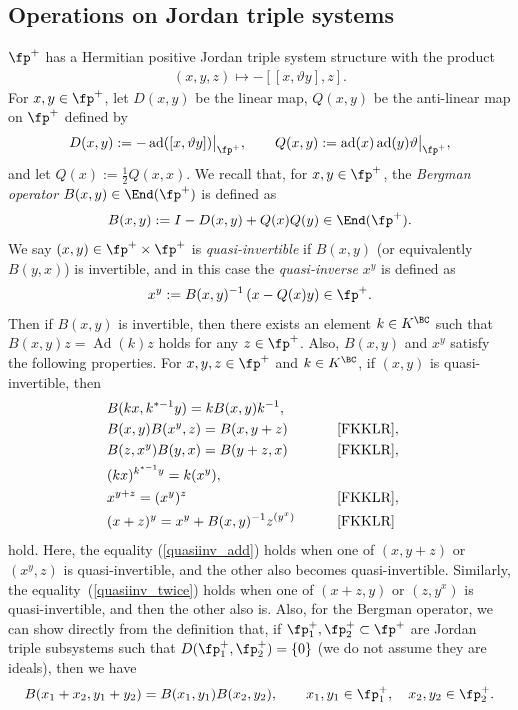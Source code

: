 \subsection{Operations on Jordan triple systems}
$\fp^+$ has a Hermitian positive Jordan triple system structure with the product
\begin{gather*} (x,y,z)\mapsto -[[x,\vartheta y],z]. \end{gather*}
For $x,y\in\fp^+$, let $D(x,y)$ be the linear map, $Q(x,y)$ be the anti-linear map on $\fp^+$ defined by
\begin{gather*} D(x,y):=-\operatorname{ad}([x,\vartheta y])\bigr|_{\fp^+},\qquad Q(x,y):=\operatorname{ad}(x)\operatorname{ad}(y)\vartheta\bigr|_{\fp^+}, \end{gather*}
and let $Q(x):=\frac{1}{2}Q(x,x)$.
We recall that, for $x,y\in\fp^+$, the \textit{Bergman operator} $B(x,y)\in\End(\fp^+)$ is defined as
\begin{gather*} B(x,y):=I-D(x,y)+Q(x)Q(y)\in\End(\fp^+). \end{gather*}
We say $(x,y)\in\fp^+\times\fp^+$ is \textit{quasi-invertible} if $B(x,y)$ (or equivalently $B(y,x)$) is invertible,
and in this case the \textit{quasi-inverse} $x^y$ is defined as
\begin{gather*} x^y:=B(x,y)^{-1} \left(x-Q(x)y\right)\in\fp^+. \end{gather*}
Then if $B(x,y)$ is invertible, then there exists an element $k\in K^\BC$ such that $B(x,y)z=\operatorname{Ad}(k)z$ holds for any $z\in\fp^+$.
Also, $B(x,y)$ and $x^y$ satisfy the following properties. For $x,y,z\in\fp^+$ and $k\in K^\BC$, if $(x,y)$ is quasi-invertible, then
\begin{alignat}{3}
& B(kx,k^{*-1}y) =kB(x,y)k^{-1}, &&\label{Bergman_k}\\
& B(x,y)B(x^y,z) =B(x,y+z) \qquad & & \text{\cite[Part V, Proposition III.3.1, (J6.4)]{FKKLR}},&\label{Bergman_left}\\
& B(z,x^y)B(y,x) =B(y+z,x) \qquad & & \text{\cite[Part V, Proposition III.3.1, (J6.4$'$)]{FKKLR}},&\label{Bergman_right}\\
& (kx)^{k^{*-1}y} =k(x^y), &&& \label{quasiinv_k}\\
& x^{y+z} =(x^y)^z \qquad & & \text{\cite[Part V, Theorem III.5.1(i)]{FKKLR}},& \label{quasiinv_add}\\
&(x+z)^y=x^y+B(x,y)^{-1}z^{(y^x)} \qquad & & \text{\cite[Part V, Theorem III.5.1(ii)]{FKKLR}}& \label{quasiinv_twice}
\end{alignat}
hold. Here, the equality (\ref{quasiinv_add}) holds when one of $(x,y+z)$ or $(x^y,z)$ is quasi-invertible,
and the other also becomes quasi-invertible. Similarly, the equality~(\ref{quasiinv_twice}) holds when one of $(x+z,y)$ or $(z,y^x)$ is
quasi-invertible, and then the other also is. Also, for the Bergman operator, we can show directly from the definition that,
if $\fp^+_1,\fp^+_2\subset \fp^+$ are Jordan triple subsystems such that $D(\fp^+_1,\fp^+_2)=\{0\}$ (we do not assume they are ideals),
then we have
\begin{gather}\label{Bergman_decomp}
B(x_1+x_2,y_1+y_2)=B(x_1,y_1)B(x_2,y_2), \qquad x_1,y_1\in\fp^+_1, \quad x_2,y_2\in\fp^+_2.
\end{gather}

